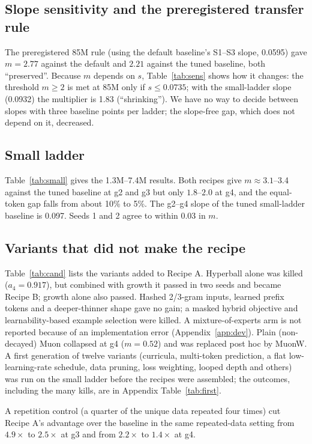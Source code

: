 \documentclass[11pt]{article}
\begin{document}
\subsection{Slope sensitivity and the preregistered transfer rule}
The preregistered 85M rule (using the default baseline's S1--S3 slope, 0.0595) gave $m=2.77$ against the default and $2.21$ against the tuned baseline, both ``preserved''.
Because $m$ depends on $s$, Table~\ref{tab:sens} shows how it changes: the threshold $m\ge2$ is met at 85M only if $s\le0.0735$; with the small-ladder slope (0.0932) the multiplier is 1.83 (``shrinking'').
We have no way to decide between slopes with three baseline points per ladder; the slope-free gap, which does not depend on it, decreased.


\subsection{Small ladder}
Table~\ref{tab:small} gives the 1.3M--7.4M results.
Both recipes give $m\approx3.1$--3.4 against the tuned baseline at g2 and g3 but only $1.8$--$2.0$ at g4, and the equal-token gap falls from about 10\% to 5\%.
The g2--g4 slope of the tuned small-ladder baseline is 0.097.
Seeds 1 and 2 agree to within 0.03 in $m$.


\subsection{Variants that did not make the recipe}
Table~\ref{tab:cand} lists the variants added to Recipe A.
Hyperball alone was killed ($a_4=0.917$), but combined with growth it passed in two seeds and became Recipe B; growth alone also passed.
Hashed 2/3-gram inputs, learned prefix tokens and a deeper-thinner shape gave no gain; a masked hybrid objective and learnability-based example selection were killed.
A mixture-of-experts arm is not reported because of an implementation error (Appendix~\ref{app:dev}).
Plain (non-decayed) Muon collapsed at g4 ($m=0.52$) and was replaced post hoc by MuonW.
A first generation of twelve variants (curricula, multi-token prediction, a flat low-learning-rate schedule, data pruning, loss weighting, looped depth and others) was run on the small ladder before the recipes were assembled; the outcomes, including the many kills, are in Appendix Table~\ref{tab:first}.

A repetition control (a quarter of the unique data repeated four times) cut Recipe A's advantage over the baseline in the same repeated-data setting from $4.9\times$ to $2.5\times$ at g3 and from $2.2\times$ to $1.4\times$ at g4.
\end{document}
